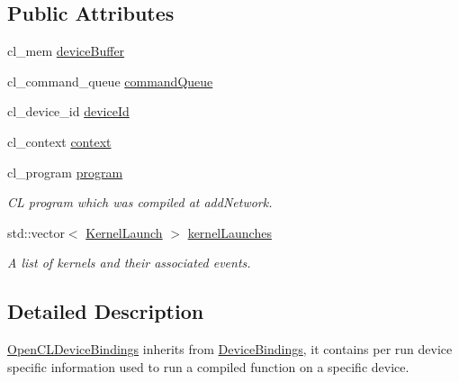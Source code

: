 \subsection*{Public Attributes}
\begin{DoxyCompactItemize}
\item 
cl\+\_\+mem \hyperlink{structglow_1_1runtime_1_1_open_c_l_device_bindings_a850b4f3047d8583f6e4e31687a8ce199}{device\+Buffer}
\item 
cl\+\_\+command\+\_\+queue \hyperlink{structglow_1_1runtime_1_1_open_c_l_device_bindings_aa2573935cebff1e159e36d1fd17ccd10}{command\+Queue}
\item 
cl\+\_\+device\+\_\+id \hyperlink{structglow_1_1runtime_1_1_open_c_l_device_bindings_a0b952fbbf354b67bb73de2626d5a6e6c}{device\+Id}
\item 
cl\+\_\+context \hyperlink{structglow_1_1runtime_1_1_open_c_l_device_bindings_ab6f3449dbe225eb437c87d497bbf688a}{context}
\item 
\mbox{\label{structglow_1_1runtime_1_1_open_c_l_device_bindings_a5873d44067d8fa3aeaf6ac669f14fc35}} 
cl\+\_\+program \hyperlink{structglow_1_1runtime_1_1_open_c_l_device_bindings_a5873d44067d8fa3aeaf6ac669f14fc35}{program}
\begin{DoxyCompactList}\small\item\em CL program which was compiled at add\+Network. \end{DoxyCompactList}\item 
\mbox{\label{structglow_1_1runtime_1_1_open_c_l_device_bindings_ae1f415d152e853ca962a4fabfb8e676c}} 
std\+::vector$<$ \hyperlink{structglow_1_1_kernel_launch}{Kernel\+Launch} $>$ \hyperlink{structglow_1_1runtime_1_1_open_c_l_device_bindings_ae1f415d152e853ca962a4fabfb8e676c}{kernel\+Launches}
\begin{DoxyCompactList}\small\item\em A list of kernels and their associated events. \end{DoxyCompactList}\end{DoxyCompactItemize}


\subsection{Detailed Description}
\hyperlink{structglow_1_1runtime_1_1_open_c_l_device_bindings}{Open\+C\+L\+Device\+Bindings} inherits from \hyperlink{classglow_1_1_device_bindings}{Device\+Bindings}, it contains per run device specific information used to run a compiled function on a specific device. 

